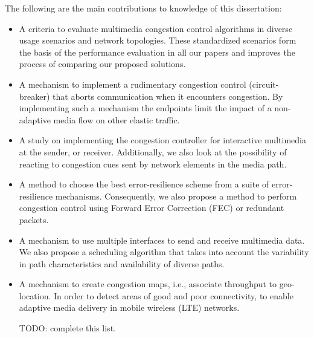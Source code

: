 The following are the main contributions to knowledge of this dissertation:

\begin{itemize}

\item A criteria to evaluate multimedia congestion control algorithms in
diverse usage scenarios and network topologies. These standardized scenarios
form the basis of the performance evaluation in all our papers and improves
the process of comparing our proposed solutions.

\item A mechanism to implement a rudimentary congestion control (circuit-
breaker) that aborts communication when it encounters congestion. By
implementing such a mechanism the endpoints limit the impact of a non-adaptive
media flow on other elastic traffic.

\item A study on implementing the congestion controller for interactive
multimedia at the sender, or receiver.  Additionally, we also look at the
possibility of reacting to congestion cues sent by network elements in the
media path.

\item A method to choose the best error-resilience scheme from a suite of
error-resilience mechanisms. Consequently, we also propose a method to perform
congestion control using Forward Error Correction (FEC) or redundant packets.

\item A mechanism to use multiple interfaces to send and receive multimedia
data. We also propose a scheduling algorithm that takes into account the
variability in path characteristics and availability of diverse paths. 

\item A mechanism to create congestion maps, i.e., associate throughput to 
geo-location. In order to detect areas of good and poor connectivity, to 
enable adaptive media delivery in mobile wireless (LTE) networks.

{\color{red} TODO: complete this list.}

\end{itemize}